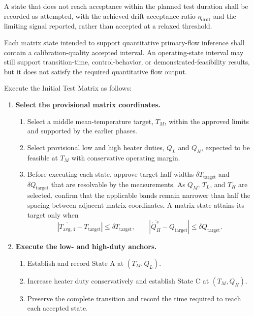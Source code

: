 \documentclass[11pt]{article}
\newcommand{\Tavg}{T_{\mathrm{avg},4}}
\newcommand{\QHs}{\dot Q_{H}^{s}}
\begin{document}
A state that does not reach acceptance within the planned test duration shall be recorded as attempted, with the achieved drift acceptance ratio $\eta_{\mathrm{drift}}$ and the limiting signal reported, rather than accepted at a relaxed threshold.

Each matrix state intended to support quantitative primary-flow inference shall contain a calibration-quality accepted interval. An operating-state interval may still support transition-time, control-behavior, or demonstrated-feasibility results, but it does not satisfy the required quantitative flow output.

Execute the Initial Test Matrix as follows:

\begin{enumerate}
    \item \textbf{Select the provisional matrix coordinates.}
    \begin{enumerate}
        \item Select a middle mean-temperature target, $T_M$, within the approved limits and supported by the earlier phases.
        \item Select provisional low and high heater duties, $Q_L$ and $Q_H$, expected to be feasible at $T_M$ with conservative operating margin.
        \item Before executing each state, approve target half-widths $\delta T_{\mathrm{target}}$ and $\delta Q_{\mathrm{target}}$ that are resolvable by the measurements. As $Q_M$, $T_L$, and $T_H$ are selected, confirm that the applicable bands remain narrower than half the spacing between adjacent matrix coordinates. A matrix state attains its target only when
        \begin{equation}
            |\overline{\Tavg}-T_{\mathrm{target}}|\leq\delta T_{\mathrm{target}},
            \qquad
            |\overline{\QHs}-Q_{\mathrm{target}}|\leq\delta Q_{\mathrm{target}}.
            \label{eq:target_bands}
        \end{equation}
    \end{enumerate}

    \item \textbf{Execute the low- and high-duty anchors.}
    \begin{enumerate}
        \item Establish and record State A at $(T_M,Q_L)$.
        \item Increase heater duty conservatively and establish State C at $(T_M,Q_H)$.
        \item Preserve the complete transition and record the time required to reach each accepted state.
    \end{enumerate}


\end{enumerate}
\end{document}
